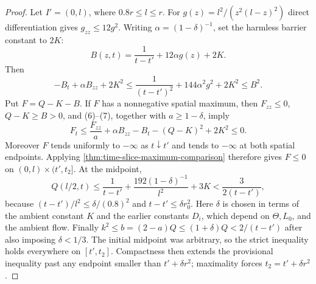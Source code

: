 \begin{proof}
Let $I'=(0,l)$, where $0.8r\le l\le r$.  For
$g(z)=l^2/(z^2(l-z)^2)$ direct differentiation gives
$g_{zz}\le12g^2$.
Writing $\alpha=(1-\delta)^{-1}$, set the harmless barrier constant to $2K$:
\[
 B(z,t)=\frac1{t-t'}+12\alpha g(z)+2K.
\]
Then
\[
 -B_t+\alpha B_{zz}+2K^2
 \le\frac1{(t-t')^2}+144\alpha^2g^2+2K^2\le B^2.                 \tag{7}
\]
Put $F=Q-K-B$.  If $F$ has a nonnegative spatial maximum, then
$F_{zz}\le0$, $Q-K\ge B>0$, and (6)--(7), together with
$a\ge1-\delta$, imply
\[
 F_t\le\frac{F_{zz}}a+\alpha B_{zz}-B_t
       -(Q-K)^2+2K^2\le0.
\]
Moreover $F$ tends uniformly to $-\infty$ as $t\downarrow t'$ and tends
to $-\infty$ at both spatial endpoints.  Applying
\ref{thm:time-slice-maximum-comparison} therefore gives
$F\le0$ on $(0,l)\times(t',t_2]$.
At the midpoint,
\[
 Q(l/2,t)\le\frac1{t-t'}+
 \frac{192(1-\delta)^{-1}}{l^2}+3K
 <\frac{3}{2(t-t')},
\]
because $(t-t')/l^2\le\delta/(0.8)^2$ and
$t-t'\le\delta r_0^2$.  Here $\delta$ is chosen in terms of the ambient
constant $K$ and the earlier constants $D_i$, which depend on
$\Theta,L_0$, and the ambient flow.  Finally
$k^2\le b=(2-a)Q\le(1+\delta)Q<2/(t-t')$ after also imposing
$\delta<1/3$.  The initial midpoint was arbitrary, so the strict inequality
holds everywhere on $[t',t_2]$.  Compactness then extends the provisional
inequality past any endpoint smaller than $t'+\delta r^2$; maximality forces
$t_2=t'+\delta r^2$.
\end{proof}

